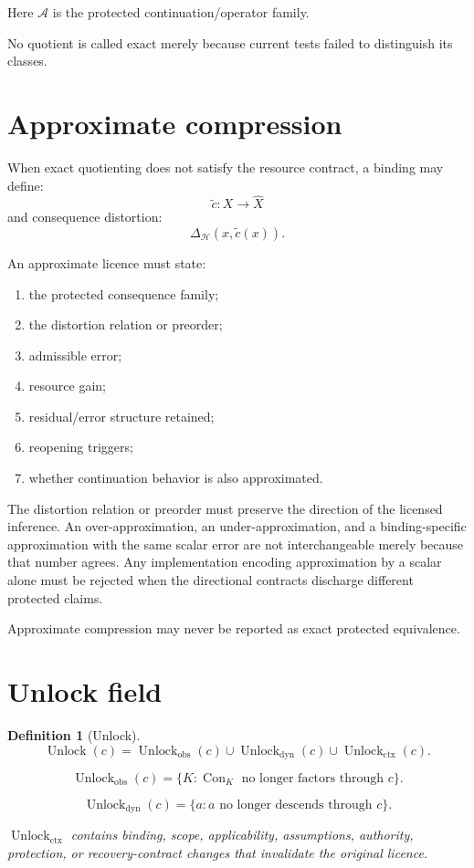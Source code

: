 \documentclass[11pt,oneside]{article}
\newtheorem{definition}{Definition}[section]
\newcommand{\Con}{\operatorname{Con}}
\newcommand{\Unlock}{\operatorname{Unlock}}
\begin{document}
Here \(\mathcal A\) is the protected continuation/operator family.

No quotient is called exact merely because current tests failed to distinguish its classes.

\section{Approximate compression}

When exact quotienting does not satisfy the resource contract, a binding may define:
\[
\widetilde c:X\to\widehat X
\]
and consequence distortion:
\[
\boxed{
\Delta_{\mathcal H}(x,\widetilde c(x)).
}
\]

An approximate licence must state:
\begin{enumerate}
\item the protected consequence family;
\item the distortion relation or preorder;
\item admissible error;
\item resource gain;
\item residual/error structure retained;
\item reopening triggers;
\item whether continuation behavior is also approximated.
\end{enumerate}

The distortion relation or preorder must preserve the direction of the licensed
inference.  An over-approximation, an under-approximation, and a binding-specific
approximation with the same scalar error are not interchangeable merely because that
number agrees.  Any implementation encoding approximation by a scalar alone must be
rejected when the directional contracts discharge different protected claims.

Approximate compression may never be reported as exact protected equivalence.

\section{Unlock field}

\begin{definition}[Unlock]
\[
\boxed{
\Unlock(c)
=
\Unlock_{\mathrm{obs}}(c)
\cup
\Unlock_{\mathrm{dyn}}(c)
\cup
\Unlock_{\mathrm{ctx}}(c).
}
\]

\[
\Unlock_{\mathrm{obs}}(c)
=
\{
K:
\Con_K
\text{ no longer factors through }c
\}.
\]

\[
\Unlock_{\mathrm{dyn}}(c)
=
\{
a:
a
\text{ no longer descends through }c
\}.
\]

\(\Unlock_{\mathrm{ctx}}\) contains binding, scope, applicability, assumptions, authority, protection, or recovery-contract changes that invalidate the original licence.
\end{definition}
\end{document}
